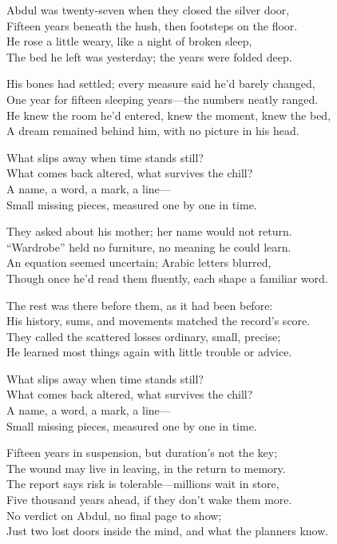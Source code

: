 \begin{lyrics}
Abdul was twenty-seven when they closed the silver door,\\
Fifteen years beneath the hush, then footsteps on the floor.\\
He rose a little weary, like a night of broken sleep,\\
The bed he left was yesterday; the years were folded deep.

His bones had settled; every measure said he’d barely changed,\\
One year for fifteen sleeping years—the numbers neatly ranged.\\
He knew the room he’d entered, knew the moment, knew the bed,\\
A dream remained behind him, with no picture in his head.

What slips away when time stands still?\\
What comes back altered, what survives the chill?\\
A name, a word, a mark, a line—\\
Small missing pieces, measured one by one in time.

They asked about his mother; her name would not return.\\
“Wardrobe” held no furniture, no meaning he could learn.\\
An equation seemed uncertain; Arabic letters blurred,\\
Though once he’d read them fluently, each shape a familiar word.

The rest was there before them, as it had been before:\\
His history, sums, and movements matched the record’s score.\\
They called the scattered losses ordinary, small, precise;\\
He learned most things again with little trouble or advice.

What slips away when time stands still?\\
What comes back altered, what survives the chill?\\
A name, a word, a mark, a line—\\
Small missing pieces, measured one by one in time.

Fifteen years in suspension, but duration’s not the key;\\
The wound may live in leaving, in the return to memory.\\
The report says risk is tolerable—millions wait in store,\\
Five thousand years ahead, if they don’t wake them more.\\
No verdict on Abdul, no final page to show;\\
Just two lost doors inside the mind, and what the planners know.


\end{lyrics}
